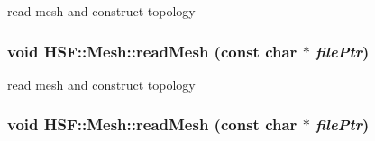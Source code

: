 read mesh and construct topology \hypertarget{classHSF_1_1Mesh_aa9073cb283b0b0be1a6131fc14fbabf3}{
\subsubsection[{readMesh}]{\setlength{\rightskip}{0pt plus 5cm}void HSF::Mesh::readMesh (const char $\ast$ {\em filePtr})}}
\label{classHSF_1_1Mesh_aa9073cb283b0b0be1a6131fc14fbabf3}


read mesh and construct topology \hypertarget{classHSF_1_1Mesh_aa9073cb283b0b0be1a6131fc14fbabf3}{
\subsubsection[{readMesh}]{\setlength{\rightskip}{0pt plus 5cm}void HSF::Mesh::readMesh (const char $\ast$ {\em filePtr})}}
\label{classHSF_1_1Mesh_aa9073cb283b0b0be1a6131fc14fbabf3}


